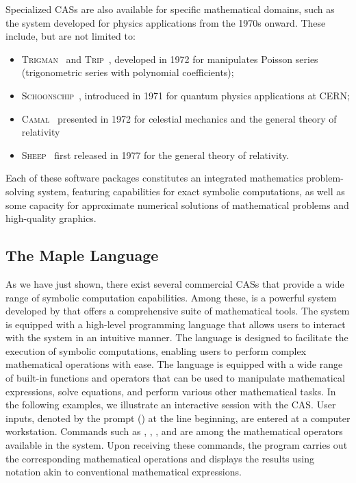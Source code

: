 %
Specialized \acp{CAS} are also available for specific mathematical domains, such as the system developed for physics applications from the 1970s onward. These include, but are not limited to:
%
\begin{itemize}
  \setlength{\itemsep}{0.0em}
  \item \textsc{Trigman}~\cite{jeffreys1972trigman} and \textsc{Trip}~\cite{gastineau2011trip}, developed in 1972 for manipulates Poisson series (trigonometric series with polynomial coefficients);
  \item \textsc{Schoonschip}~\cite{strubbe1974presentation}, introduced in 1971 for quantum physics applications at \ac{CERN};
  \item \textsc{Camal}~\cite{bourne1972camal} presented in 1972 for celestial mechanics and the general theory of relativity
  \item \textsc{Sheep}~\cite{frick1977computer} first released in 1977 for the general theory of relativity.
\end{itemize}
%
Each of these software packages constitutes an integrated mathematics problem-solving system, featuring capabilities for exact symbolic computations, as well as some capacity for approximate numerical solutions of mathematical problems and high-quality graphics.

\subsection{The Maple Language}

As we have just shown, there exist several commercial \acp{CAS} that provide a wide range of symbolic computation capabilities. Among these, \Maple{} is a powerful system developed by \MapleSoft{} that offers a comprehensive suite of mathematical tools. The \Maple{} system is equipped with a high-level programming language that allows users to interact with the system in an intuitive manner. The \Maple{} language is designed to facilitate the execution of symbolic computations, enabling users to perform complex mathematical operations with ease. The language is equipped with a wide range of built-in functions and operators that can be used to manipulate mathematical expressions, solve equations, and perform various other mathematical tasks. In the following examples, we illustrate an interactive session with the \Maple{} \ac{CAS}. User inputs, denoted by the prompt (\code{>}) at the line beginning, are entered at a computer workstation. Commands such as , , , and  are among the mathematical operators available in the \Maple{} system. Upon receiving these commands, the program carries out the corresponding mathematical operations and displays the results using notation akin to conventional mathematical expressions.

